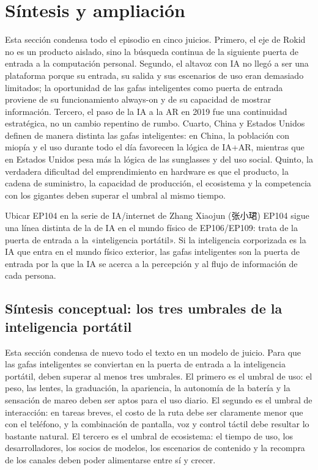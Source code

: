 \section{Síntesis y ampliación}

Esta sección condensa todo el episodio en cinco juicios. Primero, el eje de Rokid no es un producto aislado, sino la búsqueda continua de la siguiente puerta de entrada a la computación personal. Segundo, el altavoz con IA no llegó a ser una plataforma porque su entrada, su salida y sus escenarios de uso eran demasiado limitados; la oportunidad de las gafas inteligentes como puerta de entrada proviene de su funcionamiento always-on y de su capacidad de mostrar información. Tercero, el paso de la IA a la AR en 2019 fue una continuidad estratégica, no un cambio repentino de rumbo. Cuarto, China y Estados Unidos definen de manera distinta las gafas inteligentes: en China, la población con miopía y el uso durante todo el día favorecen la lógica de IA+AR, mientras que en Estados Unidos pesa más la lógica de las sunglasses y del uso social. Quinto, la verdadera dificultad del emprendimiento en hardware es que el producto, la cadena de suministro, la capacidad de producción, el ecosistema y la competencia con los gigantes deben superar el umbral al mismo tiempo.

\begin{importantbox}{Ubicar EP104 en la serie de IA/internet de Zhang Xiaojun (张小珺)}
EP104 sigue una línea distinta de la de IA en el mundo físico de EP106/EP109: trata de la puerta de entrada a la «inteligencia portátil». Si la inteligencia corporizada es la IA que entra en el mundo físico exterior, las gafas inteligentes son la puerta de entrada por la que la IA se acerca a la percepción y al flujo de información de cada persona.
\end{importantbox}

\subsection{Síntesis conceptual: los tres umbrales de la inteligencia portátil}

Esta sección condensa de nuevo todo el texto en un modelo de juicio. Para que las gafas inteligentes se conviertan en la puerta de entrada a la inteligencia portátil, deben superar al menos tres umbrales. El primero es el umbral de uso: el peso, las lentes, la graduación, la apariencia, la autonomía de la batería y la sensación de mareo deben ser aptos para el uso diario. El segundo es el umbral de interacción: en tareas breves, el costo de la ruta debe ser claramente menor que con el teléfono, y la combinación de pantalla, voz y control táctil debe resultar lo bastante natural. El tercero es el umbral de ecosistema: el tiempo de uso, los desarrolladores, los socios de modelos, los escenarios de contenido y la recompra de los canales deben poder alimentarse entre sí y crecer.

